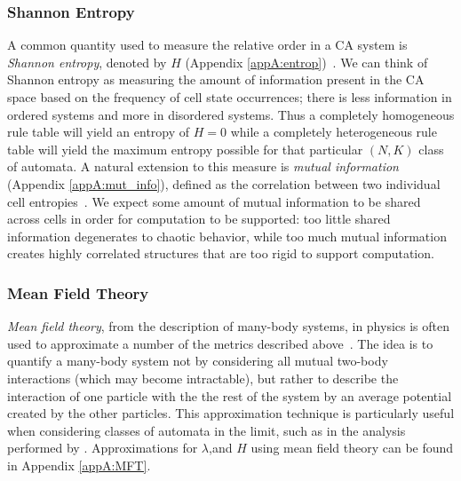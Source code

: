 \documentclass[a4paper,11pt]{article}
\begin{document}


\subsubsection*{Shannon Entropy}

A common quantity used to measure the relative order in a CA system is \textit{Shannon entropy}, denoted by $H$ (Appendix \ref{appA:entrop})~\cite{la90,li90a,wo90}. We can think of Shannon entropy as measuring the amount of information present in the CA space based on the frequency of cell state occurrences; there is less information in ordered systems and more in disordered systems. Thus a completely homogeneous rule table will yield an entropy of $H = 0$ while a completely heterogeneous rule table will yield the maximum entropy possible for that particular $(N,K)$ class of automata. A natural extension to this measure is \textit{mutual information} (Appendix \ref{appA:mut_info}), defined as the correlation between two individual cell entropies~\cite{la90}. We expect some amount of mutual information to be shared across cells in order for computation to be supported: too little shared information degenerates to chaotic behavior, while too much mutual information creates highly correlated structures that are too rigid to support computation.

\subsubsection*{Mean Field Theory}

\textit{Mean field theory}, from the description of many-body systems, in physics is often used to approximate a number of the metrics described above~\cite{li90b,wo90}. The idea is to quantify a many-body system not by considering all mutual two-body interactions (which may become intractable), but rather to describe the interaction of one particle with the the rest of the system by an average potential created by the other particles. This approximation technique is particularly useful when considering classes of automata in the limit, such as in the analysis performed by \citeauthor{wo90}. Approximations for $\lambda$,and $H$ using mean field theory can be found in Appendix \ref{appA:MFT}.
\end{document}
